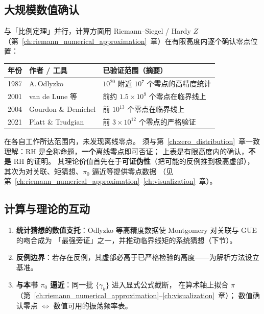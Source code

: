 \subsection{大规模数值确认}

与「比例定理」并行，计算方面用 Riemann--Siegel / Hardy $Z$
（第~\ref{ch:riemann_numerical_approximation}~章）在有限高度内逐个确认零点位置：

\begin{center}
\renewcommand{\arraystretch}{1.5}
\begin{tabular}{lll}
\toprule
\textbf{年份} & \textbf{作者 / 工具} & \textbf{已验证范围（摘要）} \\
\midrule
1987 & A.\,Odlyzko & $10^{20}$ 附近 $10^7$ 个零点的高精度统计 \\
2001 & van de Lune 等 & 前约 $1.5\times 10^9$ 个零点在临界线上 \\
2004 & Gourdon \& Demichel & 前 $10^{13}$ 个零点在临界线上 \\
2021 & Platt \& Trudgian & 前 $3\times 10^{12}$ 个零点的严格验证 \\
\bottomrule
\end{tabular}
\end{center}

在各自工作所达范围内，未发现离线零点。
须与第~\ref{ch:zero_distribution}~章一致理解：RH 是全称命题，\textbf{一个}离线零点即可否证；
上表是有限高度内的确认，\textbf{不是} RH 的证明。
其理论价值首先在于\textbf{可证伪性}（把可能的反例推到极高虚部），
其次为对关联、矩猜想、$\pi_0$ 逼近等提供零点数据
（见第~\ref{ch:riemann_numerical_approximation}--\ref{ch:visualization}~章）。

\subsection{计算与理论的互动}

\begin{enumerate}
  \item \textbf{统计猜想的数值支托}：Odlyzko 等高精度数据使 Montgomery 对关联与 GUE 的吻合成为
        「最强旁证」之一，并推动临界线矩的系统猜想（下节）。
  \item \textbf{反例边界}：若存在反例，其虚部必高于已严格检验的高度——为解析方法设立基准。
  \item \textbf{与本书 $\pi_0$ 逼近}：同一批 $\{\gamma_k\}$ 进入显式公式截断，
        在算术轴上拟合 $\pi$（第~\ref{ch:riemann_numerical_approximation}--\ref{ch:visualization}~章）；
        数值确认零点 $\Leftrightarrow$ 数值可用的振荡频率表。
\end{enumerate}

